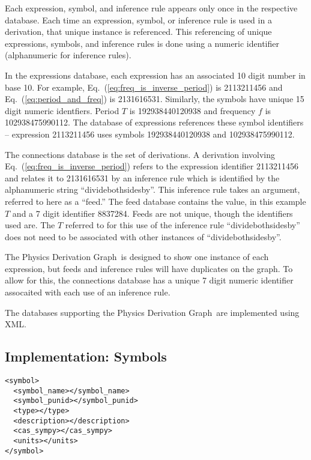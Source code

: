 \documentclass{article}
\newcommand{\eqn}[1]{Eq.\ (\ref{#1})}
\newcommand{\pdg}{Physics Derivation Graph}
\begin{document}
\begin{multicols}{2}
Each expression, symbol, and inference rule appears only once in the respective database. Each time an expression, symbol, or inference rule is used in a derivation, that unique instance is referenced. This referencing of unique expressions, symbols, and inference rules is done using a numeric identifier (alphanumeric for inference rules).

In the expressions database, each expression has an associated 10 digit number in base 10. For example, \eqn{eq:freq_is_inverse_period} is 2113211456 and \eqn{eq:period_and_freq} is 2131616531. Similarly, the symbols have unique 15 digit numeric identfiers. Period $T$ is 192938440120938 and frequency $f$ is 102938475990112. The database of expressions references these symbol identifiers -- expression 2113211456 uses symbols 192938440120938 and 102938475990112. 

The connections database is the set of derivations. A derivation involving \eqn{eq:freq_is_inverse_period} refers to the expression identifier 2113211456 and relates it to 2131616531 by an inference rule which is identified by the alphanumeric string ``dividebothsidesby''. This inference rule takes an argument, referred to here as a ``feed.'' The feed database contains the value, in this example $T$ and a 7 digit identifier 8837284. Feeds are not unique, though the identifiers used are. The $T$ referred to for this use of the inference rule ``dividebothsidesby'' does not need to be associated with other instances of ``dividebothsidesby''. 

The \pdg\ is designed to show one instance of each expression, but feeds and inference rules will have duplicates on the graph. To allow for this, the connections database has a unique 7 digit numeric identifier assocaited with each use of an inference rule. 

The databases supporting the \pdg\ are implemented using XML\cite{2008_XML}. 

\subsection{Implementation: Symbols\label{sec:symbols}}

\begin{verbatim}
<symbol>
  <symbol_name></symbol_name>
  <symbol_punid></symbol_punid>
  <type></type>
  <description></description>
  <cas_sympy></cas_sympy>
  <units></units>
</symbol>
\end{verbatim}


\end{multicols}
\end{document}

